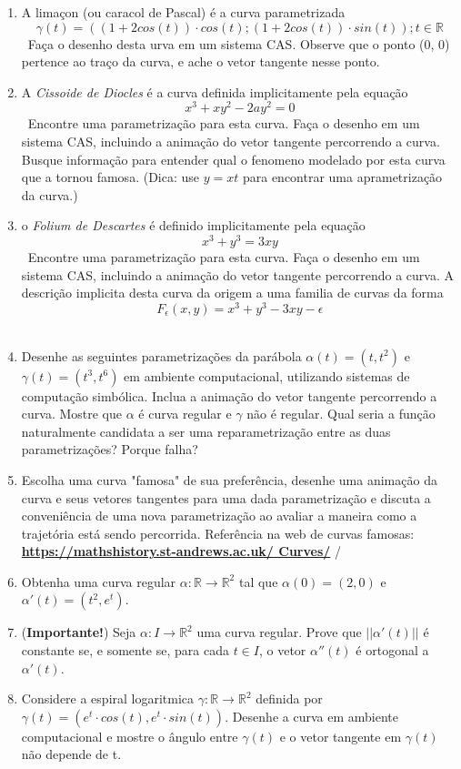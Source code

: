 \documentclass{article}
\begin{document}
\begin{enumerate}
    \item A limaçon (ou caracol de Pascal) é a curva parametrizada \
        $$\gamma(t) = ((1+2cos(t)) \cdot cos(t); (1+2cos(t)) \cdot sin(t)); t \in \mathbb{R}$$ \
        Faça o desenho desta urva em um sistema CAS. Observe que o ponto (0, 0) pertence ao traço da curva, e ache o vetor tangente nesse ponto. \
    \item A \textit{Cissoide de Diocles} é a curva definida implicitamente pela equação \
        $$x^3+xy^2-2ay^2=0$$ \
        Encontre uma parametrização para esta curva. Faça o desenho em um sistema CAS, incluindo a animação do vetor tangente percorrendo a curva. Busque informação para entender qual o fenomeno modelado por esta curva que a tornou famosa. (Dica: use $y = xt$ para encontrar uma aprametrização da curva.) \
    \item o \textit{Folium de Descartes} é definido implicitamente pela equação \
        $$x^3+y^3 = 3xy$$ \
        Encontre uma parametrização para esta curva. Faça o desenho em um sistema CAS, incluindo a animação do vetor tangente percorrendo a curva. A descrição implicita desta curva da origem a uma familia de curvas da forma \
        $$F_{\epsilon}(x, y) = x^3 + y^3 - 3xy - \epsilon$$ \
    \item Desenhe as seguintes parametrizações da parábola $\alpha(t) = (t,t^2)$ e $\gamma(t) = (t^3,t^6)$ em ambiente computacional, utilizando sistemas de computação simbólica. Inclua a animação do vetor tangente percorrendo a curva. Mostre que $\alpha$ é curva regular e $\gamma$ não é regular. Qual seria a função naturalmente candidata a ser uma reparametrização entre as duas parametrizações? Porque falha? \
    \item Escolha uma curva "famosa" de sua preferência, desenhe uma animação da curva e seus vetores tangentes para uma dada parametrização e discuta a conveniência de uma nova parametrização ao avaliar a maneira como a trajetória está sendo percorrida. Referência na web de curvas famosas: \href{https://mathshistory.st-andrews.ac.uk/
    Curves/}{\textbf{https://mathshistory.st-andrews.ac.uk/
    Curves/}} /
    \item Obtenha uma curva regular $\alpha : \mathbb{R} \to \mathbb{R}^2$ tal que $\alpha(0) = (2, 0)$ e $\alpha'(t) = (t^2, e^t)$. \
    \item (\textbf{Importante!}) Seja $\alpha : I \to \mathbb{R}^2$ uma curva regular. Prove que $||\alpha'(t)||$ é constante se, e somente se, para cada $t \in I$, o vetor $\alpha''(t)$ é ortogonal a $\alpha'(t)$. \
    \item Considere a espiral logaritmica $\gamma : \mathbb{R} \to \mathbb{R}^2$ definida por $\gamma(t) = (e^t \cdot cos(t), e^t \cdot sin(t))$. Desenhe a curva em ambiente computacional e mostre o ângulo entre $\gamma(t)$ e o vetor tangente em $\gamma(t)$ não depende de t. \ 
\end{enumerate}
\end{document}
